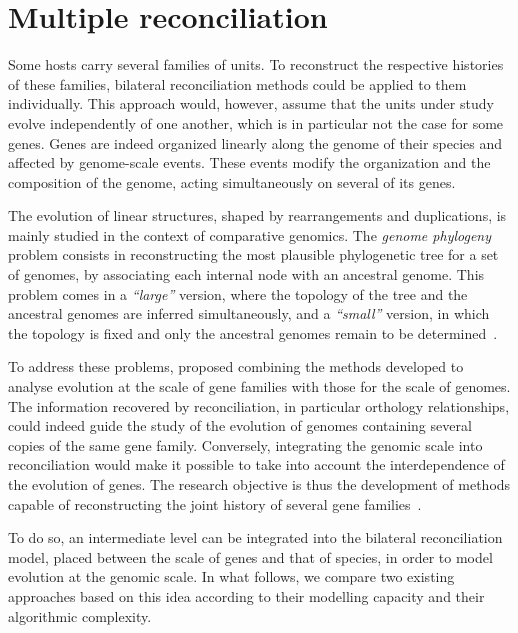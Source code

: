 \section{Multiple reconciliation}

Some hosts carry several families of units.
To reconstruct the respective histories of these families, bilateral reconciliation methods could be applied to them individually.
This approach would, however, assume that the units under study evolve independently of one another, which is in particular not the case for some genes.
Genes are indeed organized linearly along the genome of their species and affected by genome-scale events.
These events modify the organization and the composition of the genome, acting simultaneously on several of its genes.

The evolution of linear structures, shaped by rearrangements and duplications, is mainly studied in the context of comparative genomics.
The \emph{genome phylogeny} problem consists in reconstructing the most plausible phylogenetic tree for a set of genomes, by associating each internal node with an ancestral genome.
This problem comes in a \emph{\enquote{large}} version, where the topology of the tree and the ancestral genomes are inferred simultaneously, and a \emph{\enquote{small}} version, in which the topology is fixed and only the ancestral genomes remain to be determined~\parencite[for a review of these problems, see][]{ElMabrouk2012AnalysisGeneOrder}.

To address these problems, \textcite{Sankoff2000DuplicationRearrangementReconciliation} proposed combining the methods developed to analyse evolution at the scale of gene families with those for the scale of genomes.
The information recovered by reconciliation, in particular orthology relationships, could indeed guide the study of the evolution of genomes containing several copies of the same gene family.
Conversely, integrating the genomic scale into reconciliation would make it possible to take into account the interdependence of the evolution of genes.
The research objective is thus the development of methods capable of reconstructing the joint history of several gene families~\parencite[see also][]{Chauve2013DuplicationRearrangementReconciliation}.

To do so, an intermediate level can be integrated into the bilateral reconciliation model, placed between the scale of genes and that of species, in order to model evolution at the genomic scale.
In what follows, we compare two existing approaches based on this idea according to their modelling capacity and their algorithmic complexity.

